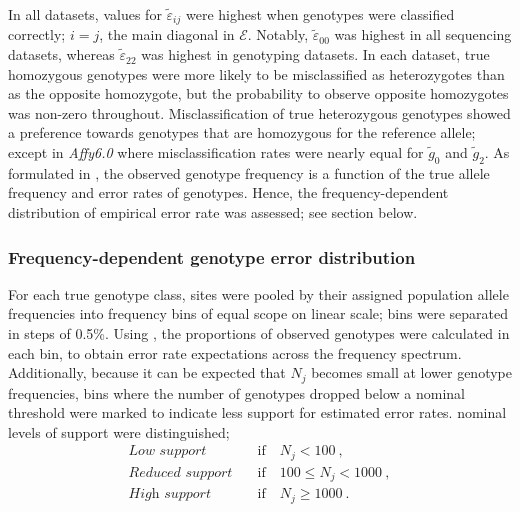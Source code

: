 %

%

In all  datasets, values for $\tilde{\varepsilon}_{ij}$ were highest when genotypes were classified correctly; \ie ${i = j}$, the main diagonal in $\mathcal{E}$.
Notably, $\tilde{\varepsilon}_{00}$ was highest in all sequencing datasets, whereas $\tilde{\varepsilon}_{22}$ was highest in genotyping datasets.
In each dataset, true homozygous genotypes were more likely to be misclassified as heterozygotes than as the opposite homozygote, but the probability to observe opposite homozygotes was non-zero throughout.
Misclassification of true heterozygous genotypes showed a preference towards genotypes that are homozygous for the reference allele; except in \emph{Affy6.0} where misclassification rates were nearly equal for $\tilde{g}_0$ and $\tilde{g}_2$.
As formulated in , the observed genotype frequency is a function of the true allele frequency and error rates of genotypes.
Hence, the frequency-dependent distribution of empirical error rate was assessed; see section below.


%
\subsubsection{Frequency-dependent genotype error distribution}
%

For each true genotype class, sites were pooled by their assigned population allele frequencies
into  frequency bins of equal scope on linear scale; \ie bins were separated in steps of 0.5\%.
Using , the proportions of observed genotypes were calculated in each bin, to obtain error rate expectations across the frequency spectrum.
Additionally, because it can be expected that $N_j$ becomes small at lower genotype frequencies, bins where the number of genotypes dropped below a nominal threshold were marked to indicate less support for estimated error rates.
 nominal levels of support were distinguished;
\begin{align*}
	\textit{Low support}     & \quad\text{if}\quad {N_j < 100}\ , \\
	\textit{Reduced support} & \quad\text{if}\quad {100 \leq N_j < 1000}\ , \\
	\textit{High support}    & \quad\text{if}\quad {N_j \geq 1000}\ .
\end{align*}

%
\label{sec:emp_gen_err_prop}
%

